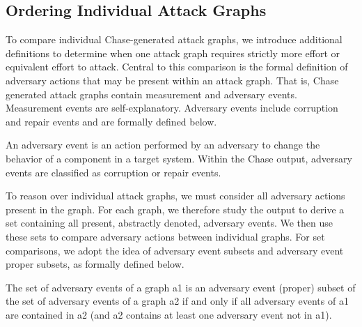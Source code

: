 \documentclass[runningheads]{llncs}
\theoremstyle{definition}
\begin{document}
\subsection*{Ordering Individual Attack Graphs}

To compare individual Chase-generated attack graphs, we introduce additional definitions to determine when one attack graph requires strictly more effort or equivalent effort to attack. Central to this comparison is the formal definition of adversary actions that may be present within an attack graph. That is, Chase generated attack graphs contain measurement and adversary events. Measurement events are self-explanatory. Adversary events include corruption and repair events and are formally defined below.


\begin{definition}
    An adversary event is an action performed by an adversary to change the behavior of a component in a target system. Within the Chase output, adversary events are classified as  corruption or repair events. 
\end{definition}

\noindent To reason over individual attack graphs, we must consider all adversary actions present in the graph. For each graph, we therefore study the output to derive a set containing all present, abstractly denoted, adversary events. We then use these sets to compare adversary actions between individual graphs. For set comparisons, we adopt the idea of adversary event subsets and adversary event proper subsets, as formally defined below. 

\begin{definition}
    The set of adversary events of a graph a1 is an adversary event (proper) subset of the set of adversary events of a graph a2 if and only if all adversary events of a1 are contained in a2 (and a2 contains at least one adversary event not in a1).
 \end{definition}
\end{document}
